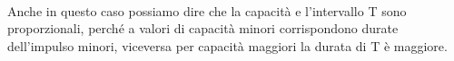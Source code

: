 \documentclass{report}
\begin{document}
\\Anche in questo caso possiamo dire che la capacità e l'intervallo T sono proporzionali, perché a valori di capacità minori corrispondono durate dell'impulso minori, viceversa per capacità maggiori la durata di T è maggiore. %

\end{document}
